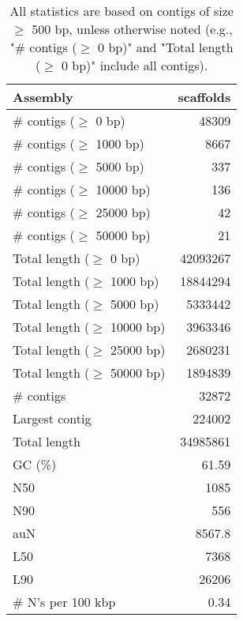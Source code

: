 \documentclass[12pt,a4paper]{article}
\begin{document}
\begin{table}[ht]
\begin{center}
\caption{All statistics are based on contigs of size $\geq$ 500 bp, unless otherwise noted (e.g., "\# contigs ($\geq$ 0 bp)" and "Total length ($\geq$ 0 bp)" include all contigs).}
\begin{tabular}{|l*{1}{|r}|}
\hline
Assembly & scaffolds \\ \hline
\# contigs ($\geq$ 0 bp) & 48309 \\ \hline
\# contigs ($\geq$ 1000 bp) & 8667 \\ \hline
\# contigs ($\geq$ 5000 bp) & 337 \\ \hline
\# contigs ($\geq$ 10000 bp) & 136 \\ \hline
\# contigs ($\geq$ 25000 bp) & 42 \\ \hline
\# contigs ($\geq$ 50000 bp) & 21 \\ \hline
Total length ($\geq$ 0 bp) & 42093267 \\ \hline
Total length ($\geq$ 1000 bp) & 18844294 \\ \hline
Total length ($\geq$ 5000 bp) & 5333442 \\ \hline
Total length ($\geq$ 10000 bp) & 3963346 \\ \hline
Total length ($\geq$ 25000 bp) & 2680231 \\ \hline
Total length ($\geq$ 50000 bp) & 1894839 \\ \hline
\# contigs & 32872 \\ \hline
Largest contig & 224002 \\ \hline
Total length & 34985861 \\ \hline
GC (\%) & 61.59 \\ \hline
N50 & 1085 \\ \hline
N90 & 556 \\ \hline
auN & 8567.8 \\ \hline
L50 & 7368 \\ \hline
L90 & 26206 \\ \hline
\# N's per 100 kbp & 0.34 \\ \hline
\end{tabular}
\end{center}
\end{table}
\end{document}
